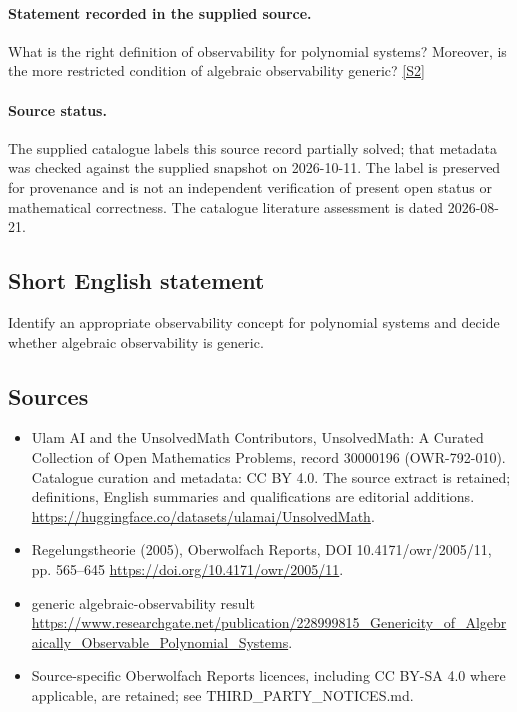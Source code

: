 \documentclass[11pt]{article}
\begin{document}
\paragraph{Statement recorded in the supplied source.}
What is the right definition of observability for polynomial systems? Moreover, is the more restricted condition of algebraic observability generic? \href{https://doi.org/10.4171/owr/2005/11}{[S2]}
\paragraph{Source status.}
The supplied catalogue labels this source record partially solved; that metadata was checked against the supplied snapshot on 2026-10-11. The label is preserved for provenance and is not an independent verification of present open status or mathematical correctness. The catalogue literature assessment is dated 2026-08-21.
\subsection{Short English statement}
Identify an appropriate observability concept for polynomial systems and decide whether algebraic observability is generic.
\subsection{Sources}
\begin{itemize}
\item[S1] Ulam AI and the UnsolvedMath Contributors, UnsolvedMath: A Curated Collection of Open Mathematics Problems, record 30000196 (OWR-792-010). Catalogue curation and metadata: CC BY 4.0. The source extract is retained; definitions, English summaries and qualifications are editorial additions.
\url{https://huggingface.co/datasets/ulamai/UnsolvedMath}.
\item[S2] Regelungstheorie (2005), Oberwolfach Reports, DOI 10.4171/owr/2005/11, pp. 565--645
\url{https://doi.org/10.4171/owr/2005/11}.
\item[S3] generic algebraic-observability result
\url{https://www.researchgate.net/publication/228999815_Genericity_of_Algebraically_Observable_Polynomial_Systems}.
\item Source-specific Oberwolfach Reports licences, including CC BY-SA 4.0 where applicable, are retained; see THIRD\_PARTY\_NOTICES.md.
\end{itemize}
\end{document}
